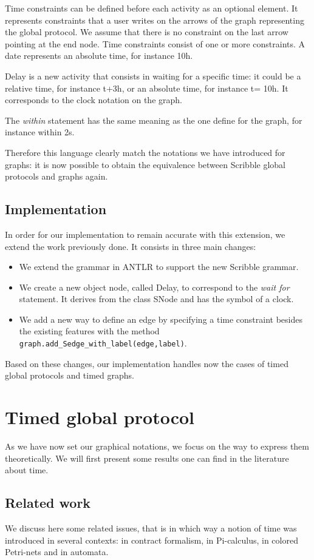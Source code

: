 \documentclass[a4paper,11pt,twoside]{report}
\begin{document}
Time constraints can be defined before each activity as an optional element. It represents constraints that a user writes on the arrows of the graph representing the global protocol. We assume that there is no constraint on the last arrow pointing at the end node. Time constraints consist of  one or more constraints. A date represents an absolute time, for instance 10h.

Delay is a new activity that consists in waiting for a specific time: it could be a relative time, for instance t+3h, or an absolute time, for instance t= 10h. It corresponds to the clock notation on the graph.

The \emph{within} statement has the same meaning as the one define for the graph, for instance within 2s.

Therefore this language clearly match the notations we have introduced for graphs: it is now possible to obtain the equivalence between Scribble global protocols and graphs again.

\section{Implementation}
In order for our implementation to remain accurate with this extension, we extend the work previously done. It consists in three main changes:
\begin{itemize}
\item We extend the grammar in ANTLR to support the new Scribble grammar.
\item We create a new object node, called Delay, to correspond to the \emph{wait for} statement. It derives from the class SNode and has the symbol of a clock.
\item We add a new way to define an edge by specifying a time constraint besides the existing features with the method \texttt{graph.add\_Sedge\_with\_label(edge,label)}.
\end{itemize}
Based on these changes, our implementation handles now the cases of timed global protocols and timed graphs.




\chapter{Timed global protocol}
As we have now set our graphical notations, we focus on the way to express them theoretically. We will first present some results one can find in the literature about time.

\section{Related work}
We discuss here some related issues, that is in which way a notion of time was introduced in several contexts: in contract formalism, in Pi-calculus, in colored Petri-nets and in automata.
\end{document}
